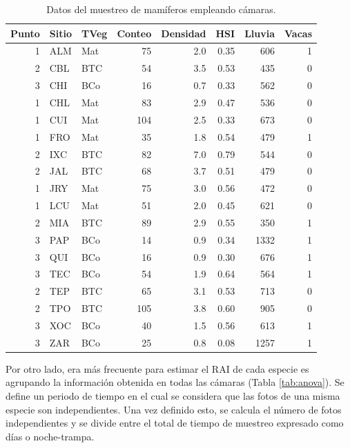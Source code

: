 \documentclass[
  11pt,
]{book}
\begin{document}
\begin{table}

\caption{\label{tab:datos}Datos del muestreo de mamíferos empleando cámaras.}
\centering
\begin{tabular}[t]{r|l|l|r|r|r|r|r}
\hline
Punto & Sitio & TVeg & Conteo & Densidad & HSI & Lluvia & Vacas\\
\hline
1 & ALM & Mat & 75 & 2.0 & 0.35 & 606 & 1\\
\hline
2 & CBL & BTC & 54 & 3.5 & 0.53 & 435 & 0\\
\hline
3 & CHI & BCo & 16 & 0.7 & 0.33 & 562 & 0\\
\hline
1 & CHL & Mat & 83 & 2.9 & 0.47 & 536 & 0\\
\hline
1 & CUI & Mat & 104 & 2.5 & 0.33 & 673 & 0\\
\hline
1 & FRO & Mat & 35 & 1.8 & 0.54 & 479 & 1\\
\hline
2 & IXC & BTC & 82 & 7.0 & 0.79 & 544 & 0\\
\hline
2 & JAL & BTC & 68 & 3.7 & 0.51 & 479 & 0\\
\hline
1 & JRY & Mat & 75 & 3.0 & 0.56 & 472 & 0\\
\hline
1 & LCU & Mat & 51 & 2.0 & 0.45 & 621 & 0\\
\hline
2 & MIA & BTC & 89 & 2.9 & 0.55 & 350 & 1\\
\hline
3 & PAP & BCo & 14 & 0.9 & 0.34 & 1332 & 1\\
\hline
3 & QUI & BCo & 16 & 0.9 & 0.30 & 676 & 1\\
\hline
3 & TEC & BCo & 54 & 1.9 & 0.64 & 564 & 1\\
\hline
2 & TEP & BTC & 65 & 3.1 & 0.53 & 713 & 0\\
\hline
2 & TPO & BTC & 105 & 3.8 & 0.60 & 905 & 0\\
\hline
3 & XOC & BCo & 40 & 1.5 & 0.56 & 613 & 1\\
\hline
3 & ZAR & BCo & 25 & 0.8 & 0.08 & 1257 & 1\\
\hline
\end{tabular}
\end{table}

\pagebreak

Por otro lado, era más frecuente para estimar el RAI de cada especie es agrupando la información obtenida en todas las cámaras (Tabla \ref{tab:anova}). Se define un periodo de tiempo en el cual se considera que las fotos de una misma especie son independientes. Una vez definido esto, se calcula el número de fotos independientes y se divide entre el total de tiempo de muestreo expresado como días o noche-trampa.
\end{document}
